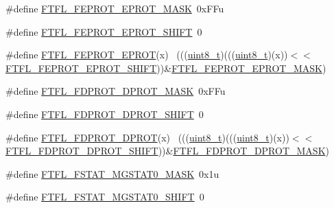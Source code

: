 \begin{DoxyCompactItemize}
\item 
\#define \hyperlink{group___f_t_f_l___register___masks_gaf8050cf8129009b1eec291d295ea4767}{F\+T\+F\+L\+\_\+\+F\+E\+P\+R\+O\+T\+\_\+\+E\+P\+R\+O\+T\+\_\+\+M\+A\+SK}~0x\+F\+Fu
\item 
\#define \hyperlink{group___f_t_f_l___register___masks_ga448539d5bf3dabcad04582543d4b31d6}{F\+T\+F\+L\+\_\+\+F\+E\+P\+R\+O\+T\+\_\+\+E\+P\+R\+O\+T\+\_\+\+S\+H\+I\+FT}~0
\item 
\#define \hyperlink{group___f_t_f_l___register___masks_gaa41070c8363819ecef557a277c6d3941}{F\+T\+F\+L\+\_\+\+F\+E\+P\+R\+O\+T\+\_\+\+E\+P\+R\+OT}(x)                                      ~(((\hyperlink{_p_e___types_8h_aba7bc1797add20fe3efdf37ced1182c5}{uint8\+\_\+t})(((\hyperlink{_p_e___types_8h_aba7bc1797add20fe3efdf37ced1182c5}{uint8\+\_\+t})(x))$<$$<$\hyperlink{group___f_t_f_l___register___masks_ga448539d5bf3dabcad04582543d4b31d6}{F\+T\+F\+L\+\_\+\+F\+E\+P\+R\+O\+T\+\_\+\+E\+P\+R\+O\+T\+\_\+\+S\+H\+I\+FT}))\&\hyperlink{group___f_t_f_l___register___masks_gaf8050cf8129009b1eec291d295ea4767}{F\+T\+F\+L\+\_\+\+F\+E\+P\+R\+O\+T\+\_\+\+E\+P\+R\+O\+T\+\_\+\+M\+A\+SK})
\item 
\#define \hyperlink{group___f_t_f_l___register___masks_ga308c1d923b4ad70d0ac4445e8cb09ac0}{F\+T\+F\+L\+\_\+\+F\+D\+P\+R\+O\+T\+\_\+\+D\+P\+R\+O\+T\+\_\+\+M\+A\+SK}~0x\+F\+Fu
\item 
\#define \hyperlink{group___f_t_f_l___register___masks_ga36e2c6a1672ab6425d570dc3b4d6b812}{F\+T\+F\+L\+\_\+\+F\+D\+P\+R\+O\+T\+\_\+\+D\+P\+R\+O\+T\+\_\+\+S\+H\+I\+FT}~0
\item 
\#define \hyperlink{group___f_t_f_l___register___masks_ga06896c18fa0af8a7f0fd652784fcda66}{F\+T\+F\+L\+\_\+\+F\+D\+P\+R\+O\+T\+\_\+\+D\+P\+R\+OT}(x)                                      ~(((\hyperlink{_p_e___types_8h_aba7bc1797add20fe3efdf37ced1182c5}{uint8\+\_\+t})(((\hyperlink{_p_e___types_8h_aba7bc1797add20fe3efdf37ced1182c5}{uint8\+\_\+t})(x))$<$$<$\hyperlink{group___f_t_f_l___register___masks_ga36e2c6a1672ab6425d570dc3b4d6b812}{F\+T\+F\+L\+\_\+\+F\+D\+P\+R\+O\+T\+\_\+\+D\+P\+R\+O\+T\+\_\+\+S\+H\+I\+FT}))\&\hyperlink{group___f_t_f_l___register___masks_ga308c1d923b4ad70d0ac4445e8cb09ac0}{F\+T\+F\+L\+\_\+\+F\+D\+P\+R\+O\+T\+\_\+\+D\+P\+R\+O\+T\+\_\+\+M\+A\+SK})
\item 
\#define \hyperlink{group___f_t_f_l___register___masks_gad88c4e31804691b13fa67b4e36bca9ae}{F\+T\+F\+L\+\_\+\+F\+S\+T\+A\+T\+\_\+\+M\+G\+S\+T\+A\+T0\+\_\+\+M\+A\+SK}~0x1u
\item 
\#define \hyperlink{group___f_t_f_l___register___masks_gae33faa3f10ce55c1955c3bc20190e189}{F\+T\+F\+L\+\_\+\+F\+S\+T\+A\+T\+\_\+\+M\+G\+S\+T\+A\+T0\+\_\+\+S\+H\+I\+FT}~0

\end{DoxyCompactItemize}
